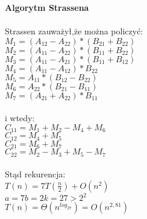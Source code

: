\textbf{Algorytm Strassena}\\
\\
Strassen zauważył,że można policzyć:\\
$M_1=(A_{12}-A_{22})\ast (B_{21}+B_{22})$\\
$M_2=(A_{11}-A_{22})\ast (B_{11}+B_{22})$\\
$M_3=(A_{11}-A_{21})\ast (B_{11}+B_{12})$\\
$M_4=(A_{11}-A_{12})\ast B_{22}$\\
$M_5=A_{11}\ast (B_{12}-B_{22})$\\
$M_6=A_{22}\ast (B_{21}-B_{11})$\\
$M_7=(A_{21}+A_{22})\ast B_{11}$\\
\\
i wtedy: \\
\tab $C_{11}=M_1+M_2-M_4+M_6$\\
\tab $C_{12}=M_4+M_5$\\
\tab $C_{21}=M_6+M_7$\\
\tab $C_{22}=M_2-M_3+M_5-M_7$\\
\\
Stąd rekurencja:\\
\tab $T(n)=7T(\frac{n}{2})+O(n^2)$\\
$a=7$\tab $b=2$\tab $k=2$\tab $7>2^2$\\
\tab $T(n)= \Theta(n^{log_27})=O(n^{2,81})$\\